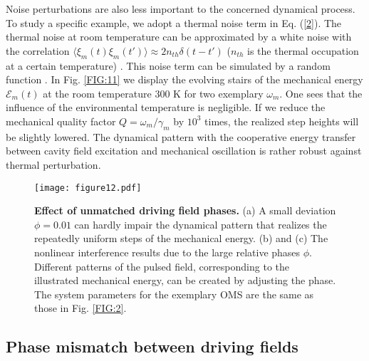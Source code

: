 \documentclass[a4paper,fleqn]{cas-dc}
\begin{document}
Noise perturbations are also less important to the concerned dynamical process. To study a specific example, we adopt a thermal noise term in Eq. (\ref{2}). The thermal noise at room temperature can be approximated by a white noise with the correlation $\langle \xi_m(t)\xi_m(t')\rangle\approx 2n_{th}\delta(t-t')$ ($n_{th}$ is the thermal occupation at a certain temperature) \cite{lin2020entangling}. This noise term can be simulated by a random function \cite{lin2021catastrophic}. In Fig. \ref{FIG:11} we display the evolving stairs of the mechanical energy $\mathcal{E}_m(t)$ at the room temperature $300$ K for two exemplary $\omega_m$. One sees that the influence of the environmental temperature is negligible. If we reduce the mechanical quality factor $Q=\omega_m/\gamma_m$ by $10^3$ times, the realized step heights will be slightly lowered. The dynamical pattern with the cooperative energy transfer between cavity field excitation and mechanical oscillation is rather robust against thermal perturbation. 

\begin{figure}
	\centering
		\texttt{[image: figure12.pdf]}
	\caption{{\bf Effect of unmatched driving field phases.} (a) A small deviation $\phi=0.01$ can hardly impair the dynamical pattern that realizes the repeatedly uniform steps of the mechanical energy. (b) and (c) 
The nonlinear interference results due to the large relative phases $\phi$. Different patterns of the pulsed field, corresponding to the illustrated  mechanical energy, can be created by adjusting the phase. The system parameters for the exemplary OMS are the same as those in Fig. \ref{FIG:2}.}
	\label{FIG:12}
\end{figure}

\subsection{Phase mismatch between driving fields}
\end{document}
